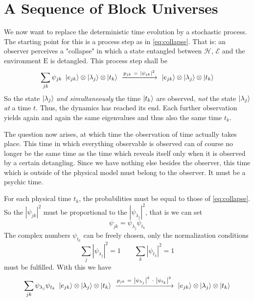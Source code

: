 \documentclass[12pt]{article}
\begin{document}
\section{A Sequence of Block Universes}

We now want to replace the deterministic time evolution by a stochastic process. The starting point for this is a process step as in \eqref{eq:collapse}. That is: an observer perceives a "collapse" in which a state entangled between $\mathscr{H}$, $\mathscr{E}$ and the environment $\mathrm{E}$ is detangled. This process step shall be
\begin{equation*} 
\sum_{jk} \psi_{jk}\ \ket{e_{jk}} \otimes \ket{\lambda_j} \otimes \ket{t_k} 
\ \xrightarrow{p_{jk}\ =\ \left|\psi_{jk}\right|^2}\ 
\ket{e_{jk}} \otimes \ket{\lambda_j} \otimes \ket{t_k}
\end{equation*}
So the state $\ket{\lambda_j}$ \emph{and simultaneously} the time $\ket{t_k}$ are observed, \emph{not} the state $\ket{\lambda_j}$ \emph{at} a time $t$. Thus, the dynamics has reached its end. Each further observation yields again and again the same eigenvalues and thus also the same time $t_k$.

The question now arises, at which time the observation of time actually takes place. This time in which everything observable is observed can of course no longer be the same time as the time which reveals itself only when it is observed by a certain detangling. Since we have nothing else besides the observer, this time which is outside of the physical model must belong to the observer. It must be a psychic time.

For each physical time $t_k$, the probabilities must be equal to those of \eqref{eq:collapse}. So the $\left|\psi_{jk}\right|^2$ must be proportional to the $\left|\psi_{\lambda_j}\right|^2$, that is we can set
\begin{equation*}
\psi_{jk} =  \psi_{\lambda_j} \psi_{t_k}
\end{equation*}
The complex numbers $\psi_{t_k}$ can be freely chosen, only the normalization conditions
\begin{equation*}
\sum_j \left|\psi_{\lambda_j}\right|^2 = 1 \quad\quad
\sum_{k} \left|\psi_{t_k}\right|^2 = 1
\end{equation*}
must be fulfilled. With this we have
\begin{equation} 
\label{eq:collapse_with_time}
\sum_{jk} \psi_{\lambda_j}\psi_{t_k} \ \ket{e_{jk}} \otimes \ket{\lambda_j} \otimes \ket{t_k} 
\ \xrightarrow{p_{jk}\ =\ \left|\psi_{\lambda_j}\right|^2\ \cdot\ \left|\psi_{t_k}\right|^2}\ 
\ket{e_{jk}} \otimes \ket{\lambda_j} \otimes \ket{t_k}
\end{equation}
\end{document}
